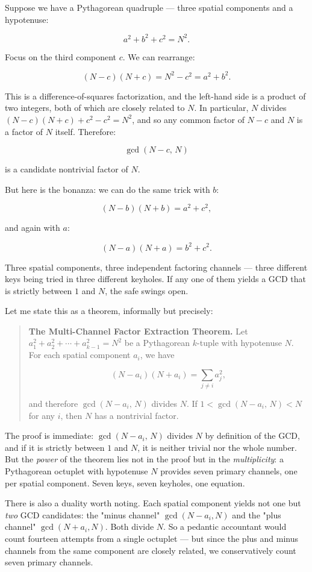 \documentclass[11pt,openany]{book}
\theoremstyle{definition}
\theoremstyle{plain}
\theoremstyle{remark}
\begin{document}
Suppose we have a Pythagorean quadruple — three spatial components and a hypotenuse:

$$a^2 + b^2 + c^2 = N^2.$$

Focus on the third component $c$. We can rearrange:

$$(N - c)(N + c) = N^2 - c^2 = a^2 + b^2.$$

This is a difference-of-squares factorization, and the left-hand side is a product of two integers, both of which are closely related to $N$. In particular, $N$ divides $(N - c)(N + c) + c^2 - c^2 = N^2$, and so any common factor of $N - c$ and $N$ is a factor of $N$ itself. Therefore:

$$\gcd(N - c, \, N)$$

is a candidate nontrivial factor of $N$.

But here is the bonanza: we can do the same trick with $b$:

$$(N - b)(N + b) = a^2 + c^2,$$

and again with $a$:

$$(N - a)(N + a) = b^2 + c^2.$$

Three spatial components, three independent factoring channels — three different keys being tried in three different keyholes. If any one of them yields a GCD that is strictly between $1$ and $N$, the safe swings open.

Let me state this as a theorem, informally but precisely:

\begin{quote}
\textbf{The Multi-Channel Factor Extraction Theorem.} Let $a_1^2 + a_2^2 + \cdots + a_{k-1}^2 = N^2$ be a Pythagorean $k$-tuple with hypotenuse $N$. For each spatial component $a_i$, we have

$$(N - a_i)(N + a_i) = \sum_{j \ne i} a_j^2,$$

and therefore $\gcd(N - a_i, \, N)$ divides $N$. If $1 < \gcd(N - a_i, \, N) < N$ for any $i$, then $N$ has a nontrivial factor.
\end{quote}


The proof is immediate: $\gcd(N - a_i, \, N)$ divides $N$ by definition of the GCD, and if it is strictly between $1$ and $N$, it is neither trivial nor the whole number. But the \textit{power} of the theorem lies not in the proof but in the \textit{multiplicity}: a Pythagorean octuplet with hypotenuse $N$ provides seven primary channels, one per spatial component. Seven keys, seven keyholes, one equation.

There is also a duality worth noting. Each spatial component yields not one but \textit{two} GCD candidates: the "minus channel" $\gcd(N - a_i, N)$ and the "plus channel" $\gcd(N + a_i, N)$. Both divide $N$. So a pedantic accountant would count fourteen attempts from a single octuplet — but since the plus and minus channels from the same component are closely related, we conservatively count seven primary channels.
\end{document}
